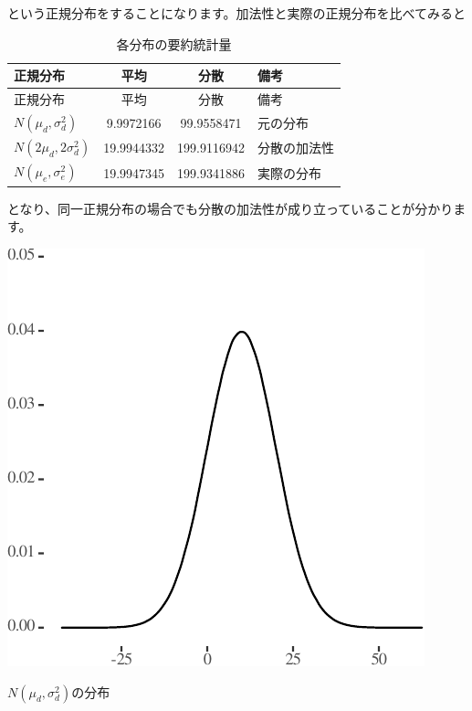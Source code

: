 \documentclass[]{tufte-handout}
\begin{document}
という正規分布をすることになります。加法性と実際の正規分布を比べてみると

\begin{longtable}[]{@{}lccl@{}}
\caption{各分布の要約統計量}\tabularnewline
\toprule
正規分布 & 平均 & 分散 & 備考 \\
\midrule
\endfirsthead
\toprule
正規分布 & 平均 & 分散 & 備考 \\
\midrule
\endhead
\(N(\mu_d, \sigma^2_d)\) & 9.9972166 & 99.9558471 & 元の分布 \\
\(N(2\mu_d, 2\sigma^2_d)\) & 19.9944332 & 199.9116942 & 分散の加法性 \\
\(N(\mu_e, \sigma^2_e)\) & 19.9947345 & 199.9341886 & 実際の分布 \\
\bottomrule
\end{longtable}

となり、同一正規分布の場合でも分散の加法性が成り立っていることが分かります。

\begin{marginfigure}

{\centering \includegraphics{AdditivityOfVariance_files/figure-latex/unnamed-chunk-8-1} 

}

\caption[$N(\mu_d, \sigma^2_d)$の分布]{$N(\mu_d, \sigma^2_d)$の分布}\label{fig:unnamed-chunk-8}
\end{marginfigure}
\end{document}
